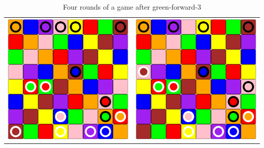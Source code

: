 \documentclass[a4paper, 11pt]{beamer}
\begin{document}
\begin{frame}
\begin{table}[htbp]
\begin{tabular}{c c}
    \includegraphics[scale = 0.11]{mathieu_4.png} & \includegraphics[scale = 0.11]{mathieu_5.png} \\
  \end{tabular}
  \caption{Four rounds of a game after green-forward-3}
 \end{table}
\end{frame}
\end{document}
